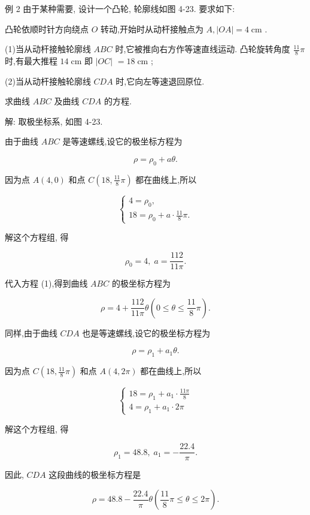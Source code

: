 \documentclass[lang=cn,newtx,10.5pt,scheme=chinese]{elegantbook}
\begin{document}
例 2 由于某种需要, 设计一个凸轮, 轮廓线如图 4-23. 要求如下:

凸轮依顺时针方向绕点 \(O\) 转动,开始时从动杆接触点为 \(A,\left| {OA}\right| = 4\mathrm{\;{cm}}\) .

(1)当从动杆接触轮廓线 \({ABC}\) 时,它被推向右方作等速直线运动. 凸轮旋转角度 \(\frac{11}{8}\pi\) 时,有最大推程 \({14}\mathrm{\;{cm}}\) 即 \(\left| {OC}\right|\) \(= {18}\mathrm{\;{cm}}\) ;

(2)当从动杆接触轮廓线 \({CDA}\) 时,它向左等速退回原位.

求曲线 \({ABC}\) 及曲线 \({CDA}\) 的方程.

解: 取极坐标系, 如图 4-23.

由于曲线 \({ABC}\) 是等速螺线,设它的极坐标方程为

\[
  \rho = {\rho }_{0} + {a\theta }. \tag{1}
\]

因为点 \(A\left( {4,0}\right)\) 和点 \(C\left( {{18},\frac{11}{8}\pi }\right)\) 都在曲线上,所以

\[
  \left\{ \begin{array}{l} 4 = {\rho }_{0}, \\ {18} = {\rho }_{0} + a \cdot \frac{11}{8}\pi . \end{array}\right.
\]

解这个方程组, 得

\[
    {\rho }_{0} = 4,\;a = \frac{112}{11\pi }.
\]

代入方程 (1),得到曲线 \({ABC}\) 的极坐标方程为

\[
  \rho = 4 + \frac{112}{11\pi }\theta \left( {0 \leq \theta \leq \frac{11}{8}\pi }\right) .
\]

同样,由于曲线 \({CDA}\) 也是等速螺线,设它的极坐标方程为

\[
  \rho = {\rho }_{1} + {a}_{1}\theta . \tag{2}
\]

因为点 \(C\left( {{18},\frac{11}{8}\pi }\right)\) 和点 \(A\left( {4,{2\pi }}\right)\) 都在曲线上,所以

\[
  \left\{ \begin{array}{l} {18} = {\rho }_{1} + {a}_{1} \cdot \frac{11\pi }{8} \\ 4 = {\rho }_{1} + {a}_{1} \cdot {2\pi } \end{array}\right.
\]

解这个方程组, 得

\[
    {\rho }_{1} = {48.8},\;{a}_{1} = - \frac{22.4}{\pi }.
\]

因此, \({CDA}\) 这段曲线的极坐标方程是

\[
  \rho = {48.8} - \frac{22.4}{\pi }\theta \left( {\frac{11}{8}\pi \leq \theta \leq {2\pi }}\right) .
\]
\end{document}
